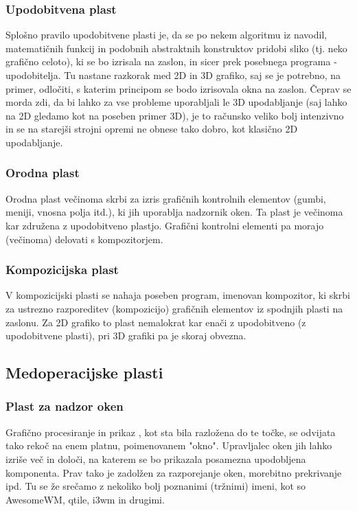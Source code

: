 \documentclass{article}
\begin{document}
\subsubsection{Upodobitvena plast}
Splošno pravilo upodobitvene plasti je, da se po nekem algoritmu iz navodil, matematičnih funkcij in podobnih abstraktnih konstruktov pridobi sliko (tj. neko grafično celoto), ki se bo izrisala na zaslon, in sicer prek posebnega programa - upodobitelja. Tu nastane razkorak med 2D in 3D grafiko, saj se je potrebno, na primer, odločiti, s katerim principom se bodo izrisovala okna na zaslon. Čeprav se morda zdi, da bi lahko za vse probleme uporabljali le 3D upodabljanje (saj lahko na 2D gledamo kot na poseben primer 3D), je to računsko veliko bolj intenzivno in se na starejši strojni opremi ne obnese tako dobro, kot klasično 2D upodabljanje.

\subsubsection{Orodna plast}
Orodna plast večinoma skrbi za izris grafičnih kontrolnih elementov (gumbi, meniji, vnosna polja itd.), ki jih uporablja nadzornik oken. Ta plast je večinoma kar združena z upodobitveno plastjo. Grafični kontrolni elementi pa morajo (večinoma) delovati s kompozitorjem.

\subsubsection{Kompozicijska plast}
V kompozicijski plasti se nahaja poseben program, imenovan kompozitor, ki skrbi za ustrezno razporeditev (kompozicijo) grafičnih elementov iz spodnjih plasti na zaslonu. Za 2D grafiko to plast nemalokrat kar enači z upodobitveno (z upodobitvene plasti), pri 3D grafiki pa je skoraj obvezna.

\subsection{Medoperacijske plasti}
\subsubsection{Plast za nadzor oken}
Grafično procesiranje in prikaz , kot sta bila razložena do te točke, se odvijata tako rekoč na enem platnu, poimenovanem "okno". Upravljalec oken jih lahko izriše več in določi, na katerem se bo prikazala posamezna upodobljena komponenta. Prav tako je zadolžen za razporejanje oken, morebitno prekrivanje ipd.
Tu se že srečamo z nekoliko bolj poznanimi (tržnimi) imeni, kot so AwesomeWM, qtile, i3wm in drugimi.
\end{document}
